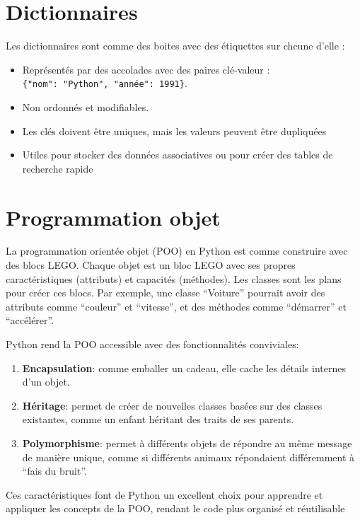 \documentclass[
  11pt,
  letterpaper,
  open=any,
  twoside=false,
  french]{scrbook}
\begin{document}
\section{Dictionnaires}\label{dictionnaires}

Les dictionnaires sont comme des boites avec des étiquettes sur chcune
d'elle :

\begin{itemize}
\item
  Représentés par des accolades avec des paires clé-valeur :
  \texttt{\{"nom":\ "Python",\ "année":\ 1991\}}.
\item
  Non ordonnés et modifiables.
\item
  Les clés doivent être uniques, mais les valeurs peuvent être
  dupliquées
\item
  Utiles pour stocker des données associatives ou pour créer des tables
  de recherche rapide
\end{itemize}

\section{Programmation objet}\label{programmation-objet}

La programmation orientée objet (POO) en Python est comme construire
avec des blocs LEGO. Chaque objet est un bloc LEGO avec ses propres
caractéristiques (attributs) et capacités (méthodes). Les classes sont
les plans pour créer ces blocs. Par exemple, une classe ``Voiture''
pourrait avoir des attributs comme ``couleur'' et ``vitesse'', et des
méthodes comme ``démarrer'' et ``accélérer''.

Python rend la POO accessible avec des fonctionnalités conviviales:

\begin{enumerate}
\def\labelenumi{\arabic{enumi}.}
\item
  \textbf{Encapsulation}: comme emballer un cadeau, elle cache les
  détails internes d'un objet.
\item
  \textbf{Héritage}: permet de créer de nouvelles classes basées sur des
  classes existantes, comme un enfant héritant des traits de ses
  parents.
\item
  \textbf{Polymorphisme}: permet à différents objets de répondre au même
  message de manière unique, comme si différents animaux répondaient
  différemment à ``fais du bruit''.
\end{enumerate}

Ces caractéristiques font de Python un excellent choix pour apprendre et
appliquer les concepts de la POO, rendant le code plus organisé et
réutilisable
\end{document}
